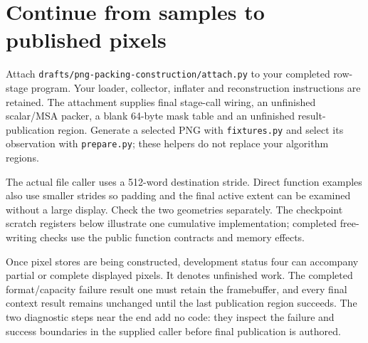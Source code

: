 \section{Continue from samples to published pixels}
Attach \texttt{drafts/png-packing-construction/attach.py} to your completed row-stage
program. Your loader, collector, inflater and reconstruction instructions are retained.
The attachment supplies final stage-call wiring, an unfinished scalar/MSA packer,
a blank 64-byte mask table and an unfinished result-publication region. Generate a
selected PNG with \texttt{fixtures.py} and select its observation with
\texttt{prepare.py}; these helpers do not replace your algorithm regions.

The actual file caller uses a 512-word destination stride. Direct function examples
also use smaller strides so padding and the final active extent can be examined
without a large display. Check the two geometries separately. The checkpoint scratch
registers below illustrate one cumulative implementation; completed free-writing
checks use the public function contracts and memory effects.

Once pixel stores are being constructed, development status four can accompany
partial or complete displayed pixels. It denotes unfinished work. The completed
format/capacity failure result one must retain the framebuffer, and every final
context result remains unchanged until the last publication region succeeds.
The two diagnostic steps near the end add no code: they inspect the failure and
success boundaries in the supplied caller before final publication is authored.
